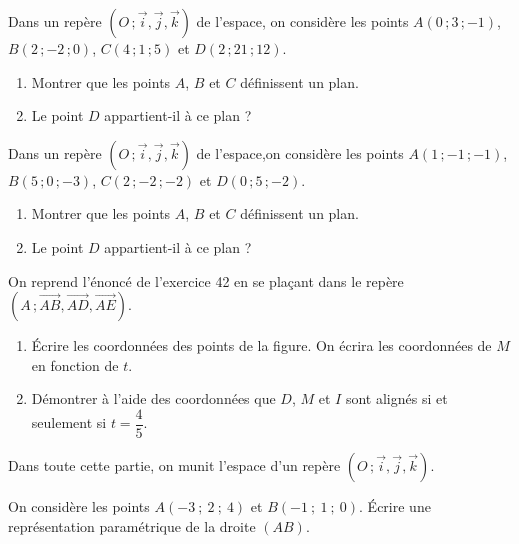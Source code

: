 \begin{colonne*exercice}
\begin{exercice}
  Dans un repère $(O\,;\vec{i},\vec{j},\vec{k})$ de l'espace, on
  considère les points $A(0\,;3\,;-1)$, $B(2\,;-2\,;0)$, $C(4\,;1\,;5)$ et
  $D(2\,;21\,;12)$.
  \begin{enumerate}
  \item Montrer que les points $A$, $B$ et $C$ définissent un plan.
  \item Le point $D$ appartient-il à ce plan ?
  \end{enumerate}
\end{exercice}

\begin{exercice}
  Dans un repère $(O\,;\vec{i},\vec{j},\vec{k})$ de l'espace,on
  considère les points $A(1\,;-1\,;-1)$, $B(5\,;0\,;-3)$, $C(2\,;-2\,;-2)$ et
  $D(0\,;5\,;-2)$.
  \begin{enumerate}
  \item Montrer que les points $A$, $B$ et $C$ définissent un plan.
  \item Le point $D$ appartient-il à ce plan ?
  \end{enumerate}
\end{exercice}

\begin{exercice}
  On reprend l'énoncé de l'exercice 42 en se plaçant dans le repère
  $(A\,;\overrightarrow{AB},\overrightarrow{AD},\overrightarrow{AE})$.
  \begin{enumerate}
  \item Écrire les coordonnées des points de la figure. On écrira les
    coordonnées de $M$ en fonction de $t$.
  \item Démontrer à l'aide des coordonnées que $D$, $M$ et $I$ sont
    alignés si et seulement si $t=\dfrac{4}{5}$.
  \end{enumerate}
\end{exercice}


Dans toute cette partie, on munit l'espace d'un repère
$(O\,;\vec{i},\vec{j},\vec{k})$.

\begin{exercice}
  On considère les points $A(-3\ ;\ 2\ ;\ 4)$ et  $B(-1\ ;\ 1\ ;\ 0)$.
  Écrire une représentation paramétrique de la droite $(AB)$.
\end{exercice}


\end{colonne*exercice}
